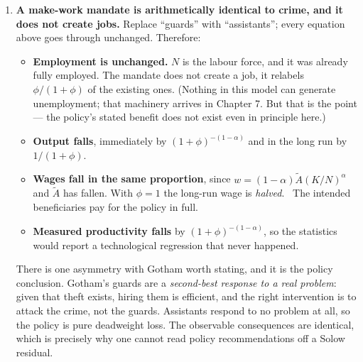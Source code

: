 \documentclass[12pt, letterpaper]{article}
\begin{document}
\begin{tcolorbox}[oddbox,title={Problem 5.5 \quad Sources of TFP}]
\begin{enumerate}
\item \textbf{A make-work mandate is arithmetically identical to crime, and it does not
create jobs.} Replace ``guards'' with ``assistants''; every equation above goes through
unchanged. Therefore:
\begin{itemize}[leftmargin=1.3em,itemsep=3pt,topsep=3pt]
\item \textbf{Employment is unchanged.} $N$ is the labour force, and it was already fully
      employed. The mandate does not create a job, it relabels $\phi/(1+\phi)$ of the
      existing ones. (Nothing in this model can generate unemployment; that machinery
      arrives in Chapter 7. But that is the point --- the policy's stated benefit does not
      exist even in principle here.)
\item \textbf{Output falls}, immediately by $(1+\phi)^{-(1-\alpha)}$ and in the long run by
      $1/(1+\phi)$.
\item \textbf{Wages fall in the same proportion}, since
      $w=(1-\alpha)\tilde A(K/N)^{\alpha}$ and $\tilde A$ has fallen. With $\phi=1$ the
      long-run wage is \emph{halved}. \checkmark\ The intended beneficiaries pay for the
      policy in full.
\item \textbf{Measured productivity falls} by $(1+\phi)^{-(1-\alpha)}$, so the statistics
      would report a technological regression that never happened.
\end{itemize}
There is one asymmetry with Gotham worth stating, and it is the policy conclusion. Gotham's
guards are a \emph{second-best response to a real problem}: given that theft exists, hiring
them is efficient, and the right intervention is to attack the crime, not the guards.
Assistants respond to no problem at all, so the policy is pure deadweight loss. The
observable consequences are identical, which is precisely why one cannot read policy
recommendations off a Solow residual.

\end{enumerate}
\end{tcolorbox}
\end{document}
